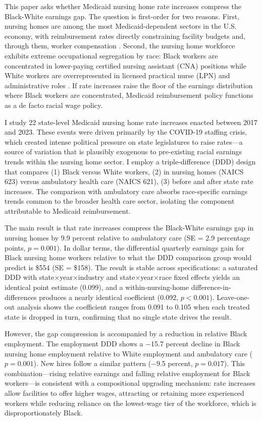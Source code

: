 \documentclass[12pt]{article}
\begin{document}
This paper asks whether Medicaid nursing home rate increases compress the Black-White earnings gap. The question is first-order for two reasons. First, nursing homes are among the most Medicaid-dependent sectors in the U.S. economy, with reimbursement rates directly constraining facility budgets and, through them, worker compensation \citep{Hackmann2019}. Second, the nursing home workforce exhibits extreme occupational segregation by race: Black workers are concentrated in lower-paying certified nursing assistant (CNA) positions while White workers are overrepresented in licensed practical nurse (LPN) and administrative roles \citep{Sloane2004, PHI2022}. If rate increases raise the floor of the earnings distribution where Black workers are concentrated, Medicaid reimbursement policy functions as a de facto racial wage policy.

I study 22 state-level Medicaid nursing home rate increases enacted between 2017 and 2023. These events were driven primarily by the COVID-19 staffing crisis, which created intense political pressure on state legislatures to raise rates---a source of variation that is plausibly exogenous to pre-existing racial earnings trends within the nursing home sector. I employ a triple-difference (DDD) design that compares (1) Black versus White workers, (2) in nursing homes (NAICS 623) versus ambulatory health care (NAICS 621), (3) before and after state rate increases. The comparison with ambulatory care absorbs race-specific earnings trends common to the broader health care sector, isolating the component attributable to Medicaid reimbursement.

The main result is that rate increases compress the Black-White earnings gap in nursing homes by 9.9 percent relative to ambulatory care (SE = 2.9 percentage points, $p = 0.001$). In dollar terms, the differential quarterly earnings gain for Black nursing home workers relative to what the DDD comparison group would predict is \$554 (SE = \$158). The result is stable across specifications: a saturated DDD with state$\times$year$\times$industry and state$\times$year$\times$race fixed effects yields an identical point estimate (0.099), and a within-nursing-home difference-in-differences produces a nearly identical coefficient (0.092, $p < 0.001$). Leave-one-out analysis shows the coefficient ranges from 0.091 to 0.105 when each treated state is dropped in turn, confirming that no single state drives the result.

However, the gap compression is accompanied by a reduction in relative Black employment. The employment DDD shows a $-$15.7 percent decline in Black nursing home employment relative to White employment and ambulatory care ($p = 0.001$). New hires follow a similar pattern ($-$9.5 percent, $p = 0.017$). This combination---rising relative earnings and falling relative employment for Black workers---is consistent with a compositional upgrading mechanism: rate increases allow facilities to offer higher wages, attracting or retaining more experienced workers while reducing reliance on the lowest-wage tier of the workforce, which is disproportionately Black.
\end{document}
